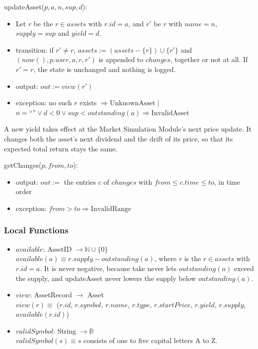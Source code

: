 \documentclass[12pt, titlepage]{article}
\begin{document}
\noindent updateAsset($p, a, n, \mathit{sup}, d$):
\begin{itemize}
\item Let $r$ be the $r \in \mathit{assets}$ with $r.\mathit{id} = a$, and
  $r'$ be $r$ with $\mathit{name} = n$, $\mathit{supply} = \mathit{sup}$
  and $\mathit{yield} = d$.
\item transition: if $r' \neq r$, $\mathit{assets} := (\mathit{assets} -
  \{r\}) \cup \{r'\}$ and $(\mathit{now}(), p.\mathit{user}, a, r, r')$ is
  appended to $\mathit{changes}$, together or not at all. If $r' = r$, the
  state is unchanged and nothing is logged.
\item output: $\mathit{out} := \mathit{view}(r')$
\item exception: no such $r$ exists $\Rightarrow \mathrm{UnknownAsset}
  \mid{}$ $n = \text{``''} \vee d < 0 \vee \mathit{sup} <
  \mathit{outstanding}(a) \Rightarrow \mathrm{InvalidAsset}$
\end{itemize}

\noindent A new yield takes effect at the Market Simulation Module's next
price update. It changes both the asset's next dividend and the drift of its
price, so that its expected total return stays the same.

\medskip

\noindent getChanges($p, \mathit{from}, \mathit{to}$):
\begin{itemize}
\item output: $\mathit{out} :=$ the entries $c$ of $\mathit{changes}$ with
  $\mathit{from} \leq c.\mathit{time} \leq \mathit{to}$, in time order
\item exception: $\mathit{from} > \mathit{to} \Rightarrow
  \mathrm{InvalidRange}$
\end{itemize}

\subsubsection{Local Functions}

\begin{itemize}
\item $\mathit{available}$: AssetID $\rightarrow \mathbb{N} \cup \{0\}$\\
  $\mathit{available}(a) \equiv r.\mathit{supply} -
  \mathit{outstanding}(a)$, where $r$ is the $r \in \mathit{assets}$ with
  $r.\mathit{id} = a$. It is never negative, because take never lets
  $\mathit{outstanding}(a)$ exceed the supply, and updateAsset never lowers
  the supply below $\mathit{outstanding}(a)$.
\item $\mathit{view}$: AssetRecord $\rightarrow$ Asset\\
  $\mathit{view}(r) \equiv$ ($r.\mathit{id}$, $r.\mathit{symbol}$,
  $r.\mathit{name}$, $r.\mathit{type}$, $r.\mathit{startPrice}$,
  $r.\mathit{yield}$, $r.\mathit{supply}$, $\mathit{available}(r.\mathit{id})$)
\item $\mathit{validSymbol}$: String $\rightarrow \mathbb{B}$\\
  $\mathit{validSymbol}(s) \equiv s$ consists of one to five capital
  letters A to Z.
\end{itemize}
\end{document}
